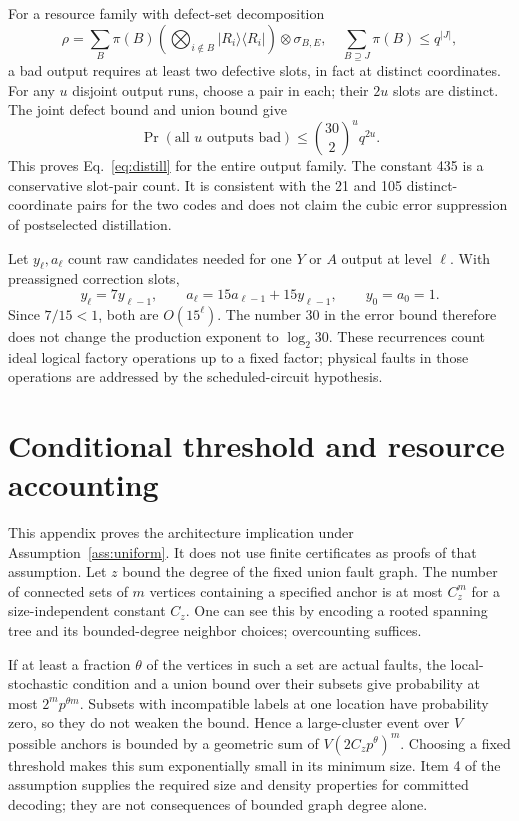 For a resource family with defect-set decomposition
\begin{equation}
 \rho=\sum_B\pi(B)
   \left(\bigotimes_{i\notin B}|R_i\rangle\langle R_i|\right)
   \otimes\sigma_{B,E},\quad
 \sum_{B\supseteq J}\pi(B)\le q^{|J|},
\end{equation}
a bad output requires at least two defective slots, in fact at distinct
coordinates. For any $u$ disjoint output runs, choose a pair in each;
their $2u$ slots are distinct. The joint defect bound and union bound give
\begin{equation}
 \Pr(\text{all }u\text{ outputs bad})
 \le \binom{30}{2}^{u}q^{2u}.
\end{equation}
This proves Eq.~\eqref{eq:distill} for the entire output family. The
constant 435 is a conservative slot-pair count. It is consistent with
the 21 and 105 distinct-coordinate pairs for the two codes and does not
claim the cubic error suppression of postselected distillation.

Let $y_\ell,a_\ell$ count raw candidates needed for one $Y$ or $A$
output at level $\ell$. With preassigned correction slots,
\begin{equation}
 y_\ell=7y_{\ell-1},\qquad
 a_\ell=15a_{\ell-1}+15y_{\ell-1},\qquad y_0=a_0=1.
\end{equation}
Since $7/15<1$, both are $O(15^\ell)$. The number 30 in the error
bound therefore does not change the production exponent to
$\log_2 30$. These recurrences count ideal logical factory operations
up to a fixed factor; physical faults in those operations are addressed
by the scheduled-circuit hypothesis.

\section{Conditional threshold and resource accounting}
\label{app:conditional}

This appendix proves the architecture implication under
Assumption~\ref{ass:uniform}. It does not use finite certificates as
proofs of that assumption. Let $z$ bound the degree of the fixed union
fault graph. The number of connected sets of $m$ vertices containing a
specified anchor is at most $C_z^m$ for a size-independent constant
$C_z$. One can see this by encoding a rooted spanning tree and its
bounded-degree neighbor choices; overcounting suffices.

If at least a fraction $\theta$ of the vertices in such a set are actual
faults, the local-stochastic condition and a union bound over their
subsets give probability at most $2^m p^{\theta m}$. Subsets with
incompatible labels at one location have probability zero, so they do
not weaken the bound. Hence a large-cluster event over $V$ possible
anchors is bounded by a geometric sum of
$V(2C_zp^\theta)^m$. Choosing a fixed threshold makes this sum
exponentially small in its minimum size. Item 4 of the assumption
supplies the required size and density properties for committed decoding;
they are not consequences of bounded graph degree alone.

